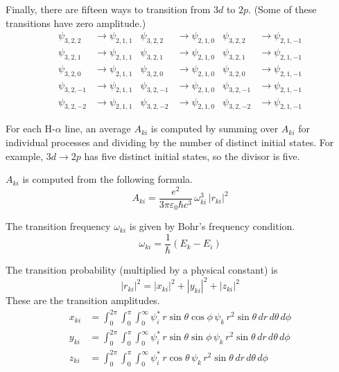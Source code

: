Finally, there are fifteen ways to transition from $3d$ to $2p$.
(Some of these transitions have zero amplitude.)
\begin{align*}
\psi_{3,2,2}&\rightarrow\psi_{2,1,1} &
\psi_{3,2,2}&\rightarrow\psi_{2,1,0} &
\psi_{3,2,2}&\rightarrow\psi_{2,1,-1}
\\
\psi_{3,2,1}&\rightarrow\psi_{2,1,1} &
\psi_{3,2,1}&\rightarrow\psi_{2,1,0} &
\psi_{3,2,1}&\rightarrow\psi_{2,1,-1}
\\
\psi_{3,2,0}&\rightarrow\psi_{2,1,1} &
\psi_{3,2,0}&\rightarrow\psi_{2,1,0} &
\psi_{3,2,0}&\rightarrow\psi_{2,1,-1}
\\
\psi_{3,2,-1}&\rightarrow\psi_{2,1,1} &
\psi_{3,2,-1}&\rightarrow\psi_{2,1,0} &
\psi_{3,2,-1}&\rightarrow\psi_{2,1,-1}
\\
\psi_{3,2,-2}&\rightarrow\psi_{2,1,1} &
\psi_{3,2,-2}&\rightarrow\psi_{2,1,0} &
\psi_{3,2,-2}&\rightarrow\psi_{2,1,-1}
\end{align*}

For each H-$\alpha$ line, an average $A_{ki}$ is computed by summing over $A_{ki}$ for individual processes
and dividing by the number of distinct initial states.
For example, $3d\rightarrow2p$ has five distinct initial states, so the divisor is five.

\bigskip
$A_{ki}$ is computed from the following formula.
\begin{equation*}
A_{ki}=\frac{e^2}{3\pi\varepsilon_0\hbar c^3}\,\omega_{ki}^3\,|r_{ki}|^2
\end{equation*}

The transition frequency $\omega_{ki}$ is given by Bohr's frequency condition.
\begin{equation*}
\omega_{ki}=\frac{1}{\hbar}(E_k-E_i)
\end{equation*}

The transition probability (multiplied by a physical constant) is
\begin{equation*}
|r_{ki}|^2
=|x_{ki}|^2
+|y_{ki}|^2
+|z_{ki}|^2
\end{equation*}
These are the transition amplitudes.
\begin{align*}
x_{ki}&=\int_0^{2\pi}\int_0^\pi\int_0^\infty
\psi_i^*\,r\sin\theta\cos\phi\,\psi_k
\,r^2\sin\theta\,dr\,d\theta\,d\phi
\\
y_{ki}&=\int_0^{2\pi}\int_0^\pi\int_0^\infty
\psi_i^*\,r\sin\theta\sin\phi\,\psi_k
\,r^2\sin\theta\,dr\,d\theta\,d\phi
\\
z_{ki}&=\int_0^{2\pi}\int_0^\pi\int_0^\infty
\psi_i^*\,r\cos\theta\,\psi_k
\,r^2\sin\theta\,dr\,d\theta\,d\phi
\end{align*}

